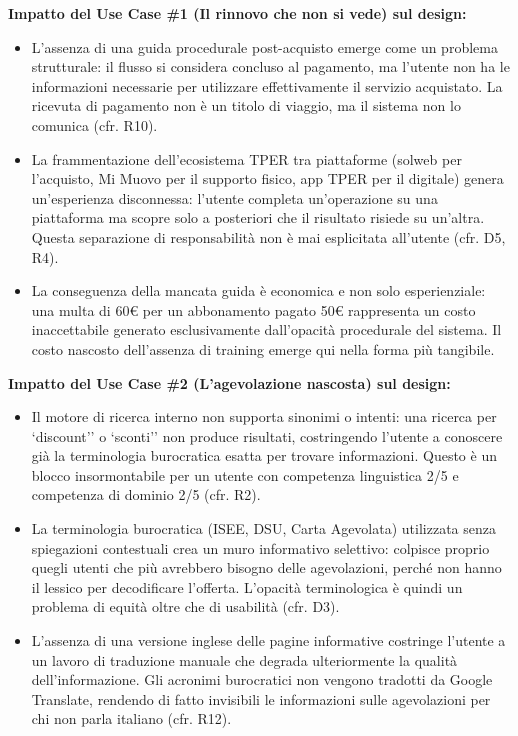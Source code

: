 \documentclass[11pt,a4paper]{article}
\begin{document}
\begin{tcolorbox}[colback=backgroundColor,colframe=borderColor,arc=2mm]
    {\small
    \textbf{Impatto del Use Case \#1 (Il rinnovo che non si vede) sul design:} \\[4pt]
    \begin{itemize}[leftmargin=*]
        \item L'assenza di una guida procedurale post-acquisto emerge come un problema strutturale: il flusso si considera concluso al pagamento, ma l'utente non ha le informazioni necessarie per utilizzare effettivamente il servizio acquistato. La ricevuta di pagamento non è un titolo di viaggio, ma il sistema non lo comunica (cfr. R10).
        \item La frammentazione dell'ecosistema TPER tra piattaforme (solweb per l'acquisto, Mi Muovo per il supporto fisico, app TPER per il digitale) genera un'esperienza disconnessa: l'utente completa un'operazione su una piattaforma ma scopre solo a posteriori che il risultato risiede su un'altra. Questa separazione di responsabilità non è mai esplicitata all'utente (cfr. D5, R4).
        \item La conseguenza della mancata guida è economica e non solo esperienziale: una multa di 60\euro{} per un abbonamento pagato 50\euro{} rappresenta un costo inaccettabile generato esclusivamente dall'opacità procedurale del sistema. Il costo nascosto dell'assenza di training emerge qui nella forma più tangibile.
    \end{itemize}
    \vspace{0.2cm}
    \textbf{Impatto del Use Case \#2 (L'agevolazione nascosta) sul design:} \\[4pt]
    \begin{itemize}[leftmargin=*]
        \item Il motore di ricerca interno non supporta sinonimi o intenti: una ricerca per `discount'' o `sconti'' non produce risultati, costringendo l'utente a conoscere già la terminologia burocratica esatta per trovare informazioni. Questo è un blocco insormontabile per un utente con competenza linguistica 2/5 e competenza di dominio 2/5 (cfr. R2).
        \item La terminologia burocratica (ISEE, DSU, Carta Agevolata) utilizzata senza spiegazioni contestuali crea un muro informativo selettivo: colpisce proprio quegli utenti che più avrebbero bisogno delle agevolazioni, perché non hanno il lessico per decodificare l'offerta. L'opacità terminologica è quindi un problema di equità oltre che di usabilità (cfr. D3).
        \item L'assenza di una versione inglese delle pagine informative costringe l'utente a un lavoro di traduzione manuale che degrada ulteriormente la qualità dell'informazione. Gli acronimi burocratici non vengono tradotti da Google Translate, rendendo di fatto invisibili le informazioni sulle agevolazioni per chi non parla italiano (cfr. R12).
    \end{itemize}
    }
\end{tcolorbox}
\end{document}
